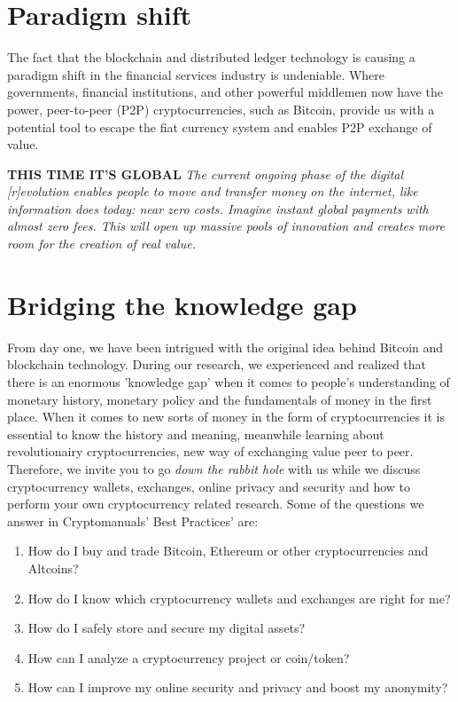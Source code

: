 \section*{Paradigm shift}
The fact that the blockchain and distributed ledger technology is causing a paradigm shift in the financial services industry is undeniable. Where governments, financial institutions, and other powerful middlemen now have the power, peer-to-peer (P2P) cryptocurrencies, such as Bitcoin, provide us with a potential tool to escape the fiat currency system and enables P2P exchange of value. 

    \bigskip
    \begin{cryptobox}{\textbf{THIS TIME IT'S GLOBAL}}
        \textit{The current ongoing phase of the digital [r]evolution enables people to move and transfer money on the internet, like information does today: near zero costs. Imagine instant global payments with almost zero fees. This will open up massive pools of innovation and creates more room for the creation of real value.}
    \end{cryptobox}

\section*{Bridging the knowledge gap}
From day one, we have been intrigued with the original idea behind Bitcoin and blockchain technology. During our research, we  experienced and realized that there is an enormous 'knowledge gap' when it comes to people's understanding of monetary history, monetary policy and the fundamentals of money in the first place. When it comes to new sorts of money in the form of cryptocurrencies it is essential to know the history and meaning, meanwhile learning about revolutionairy cryptocurrencies, new way of exchanging value peer to peer. Therefore, we invite you to go \emph{down the rabbit hole} with us while we discuss cryptocurrency wallets, exchanges, online privacy and security and how to perform your own cryptocurrency related research. 
Some of the questions we answer in Cryptomanuals' Best Practices' are:\medskip 

\medskip


\begin{enumerate}[label=(\alph*)]
  \setlength\itemsep{0em}
    \item {How do I buy and trade Bitcoin, Ethereum or other cryptocurrencies and Altcoins?} 
    \item {How do I know which cryptocurrency wallets and exchanges are right for me?}
    \item {How do I safely store and secure my digital assets?}
    \item {How can I analyze a cryptocurrency project or coin/token?} 
    \item {How can I improve my online security and privacy and boost my anonymity?}

\end{enumerate}

